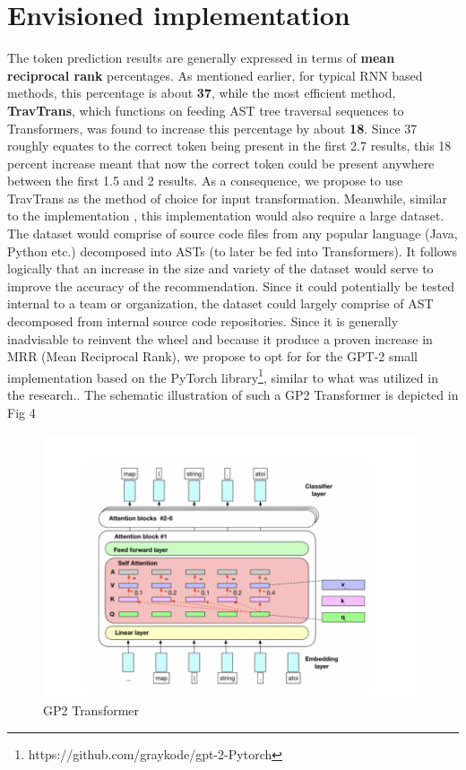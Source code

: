 \documentclass[sigplan,screen,9pt]{acmart}
\begin{document}
\section{Envisioned implementation}
The token prediction results are generally expressed in terms of \textbf{mean reciprocal rank} percentages. As mentioned earlier, for typical RNN based methods, this percentage is about \textbf{37}, while the most efficient method, \textbf{TravTrans}, which functions on feeding AST tree traversal sequences to Transformers, was found to increase this percentage by about \textbf{18}. Since 37 roughly equates to the correct token being present in the first 2.7 results, this 18 percent increase meant that now the correct token could be present anywhere between the first 1.5 and 2 results. As a consequence, we propose to use TravTrans as the method of choice for input transformation. 
Meanwhile, similar to the implementation \cite{FeedTree}, this implementation would also require a large dataset. The dataset would comprise of source code files from any popular language (Java, Python etc.) decomposed into ASTs (to later be fed into Transformers). It follows logically that an increase in the size and variety of the dataset would serve to improve the accuracy of the recommendation. Since it could potentially be tested internal to a team or organization, the dataset could largely comprise of AST decomposed from internal source code repositories. Since it is generally inadvisable to reinvent the wheel and because it produce a proven increase in MRR (Mean Reciprocal Rank), we propose to opt for for the GPT-2 small implementation\cite{radford2019language} based on the PyTorch library\footnote{https://github.com/graykode/gpt-2-Pytorch}, similar to what was utilized in the research.\cite{FeedTree}. The schematic illustration of such a GP2 Transformer is depicted in Fig 4
\begin{figure}[h]
  \centering
  \includegraphics[width=\linewidth]{figs/transformer.png}
  \caption{GP2 Transformer}
\end{figure}





%
\end{document}
